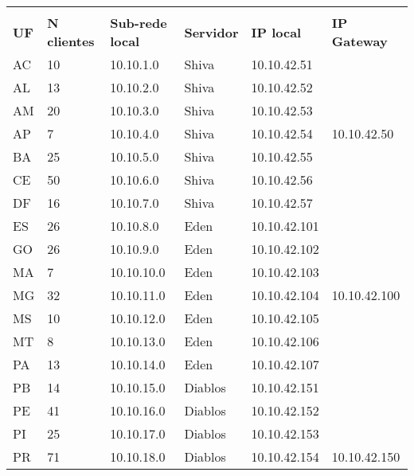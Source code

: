 \begin{table}[h]
    \label{tbl:testbed-ipe-net}
    \centering
    \begin{tabular}{llllll}
        \rowcolor[HTML]{000000} 
        \multicolumn{6}{c}{\cellcolor[HTML]{000000}{\color[HTML]{C0C0C0} 
            \textbf{Associação de Servidores à simulação da rede IPÊ}}} \\
        \rowcolor[HTML]{000000} 
        {\color[HTML]{9B9B9B} \textbf{UF}} & {\color[HTML]{9B9B9B} 
            \textbf{N clientes}} & {\color[HTML]{9B9B9B} 
            \textbf{Sub-rede local}} & {\color[HTML]{9B9B9B} 
            \textbf{Servidor}} & {\color[HTML]{9B9B9B} \textbf{IP local}} & 
            {\color[HTML]{9B9B9B} \textbf{IP Gateway}} \\
        AC &  10 &  10.10.1.0 &   Shiva  &  10.10.42.51 & \\ 
        AL  & 13 &  10.10.2.0  &  Shiva  &  10.10.42.52 & \\ 
        AM  & 20 &  10.10.3.0 &   Shiva  &  10.10.42.53 & \\
        AP  & 7  &  10.10.4.0 &   Shiva  &  10.10.42.54 & 10.10.42.50 \\
        BA  & 25 &  10.10.5.0 &   Shiva  &  10.10.42.55 & \\
        CE  & 50  & 10.10.6.0  &  Shiva  &  10.10.42.56 & \\
        DF  & 16 &  10.10.7.0  &  Shiva  &  10.10.42.57 & \\ \hline
        ES  & 26  & 10.10.8.0  &  Eden  &   10.10.42.101 & \\
        GO  & 26  & 10.10.9.0  &  Eden  &   10.10.42.102  & \\  
        MA  & 7  &  10.10.10.0 &  Eden  &   10.10.42.103  & \\  
        MG  & 32  & 10.10.11.0  & Eden  &   10.10.42.104  & 10.10.42.100 \\  
        MS  & 10  & 10.10.12.0  & Eden  &   10.10.42.105  & \\  
        MT  & 8   & 10.10.13.0  & Eden  &   10.10.42.106  & \\  
        PA  & 13  & 10.10.14.0  & Eden  &   10.10.42.107  & \\ \hline
        PB  & 14  & 10.10.15.0  & Diablos & 10.10.42.151  & \\
        PE  & 41  & 10.10.16.0  & Diablos & 10.10.42.152  & \\  
        PI &  25 &  10.10.17.0 &  Diablos & 10.10.42.153  & \\  
        PR &  71 &  10.10.18.0 &  Diablos & 10.10.42.154  & 10.10.42.150 \\

\end{tabular}
\end{table}
